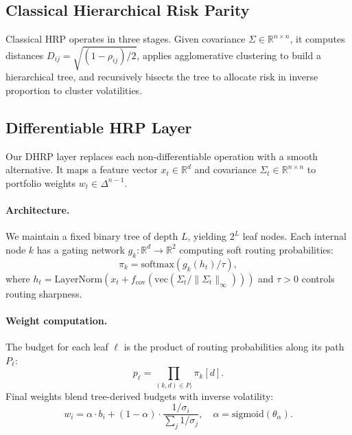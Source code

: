 \subsection{Classical Hierarchical Risk Parity}

Classical HRP operates in three stages. Given covariance $\Sigma \in \mathbb{R}^{n \times n}$, it computes distances $D_{ij} = \sqrt{(1 - \rho_{ij})/2}$, applies agglomerative clustering to build a hierarchical tree, and recursively bisects the tree to allocate risk in inverse proportion to cluster volatilities.

\subsection{Differentiable HRP Layer}

Our DHRP layer replaces each non-differentiable operation with a smooth alternative. It maps a feature vector $x_t \in \mathbb{R}^d$ and covariance $\Sigma_t \in \mathbb{R}^{n \times n}$ to portfolio weights $w_t \in \Delta^{n-1}$.

\paragraph{Architecture.} We maintain a fixed binary tree of depth $L$, yielding $2^L$ leaf nodes. Each internal node $k$ has a gating network $g_k: \mathbb{R}^d \to \mathbb{R}^2$ computing soft routing probabilities:
\begin{equation}
\pi_k = \text{softmax}(g_k(h_t) / \tau),
\end{equation}
where $h_t = \text{LayerNorm}(x_t + f_{\text{cov}}(\text{vec}(\Sigma_t / \|\Sigma_t\|_\infty)))$ and $\tau > 0$ controls routing sharpness.

\paragraph{Weight computation.} The budget for each leaf $\ell$ is the product of routing probabilities along its path $P_\ell$:
\begin{equation}
p_\ell = \prod_{(k, d) \in P_\ell} \pi_k[d].
\end{equation}
Final weights blend tree-derived budgets with inverse volatility:
\begin{equation}
w_i = \alpha \cdot b_i + (1 - \alpha) \cdot \frac{1/\sigma_i}{\sum_j 1/\sigma_j}, \quad \alpha = \text{sigmoid}(\theta_\alpha).
\end{equation}

